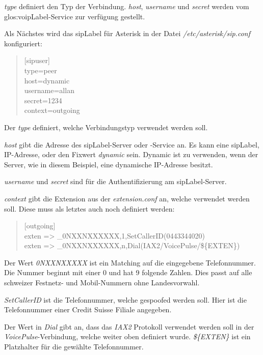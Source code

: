 \textit{type} definiert den Typ der Verbindung. \textit{host}, \textit{username} und \textit{secret} werden vom \gls{glos:voipLabel}-Service zur verfügung gestellt.

Als Nächstes wird das \Gls{sipLabel} für Asterisk in der Datei \textit{/etc/asterisk/sip.conf} konfiguriert:
\begin{quote}
[sipuser]\\
type=peer\\
host=dynamic\\
username=allan\\
secret=1234\\
context=outgoing\\
\end{quote}

Der \textit{type} definiert, welche Verbindungstyp verwendet werden soll.

\textit{host} gibt die Adresse des \Gls{sipLabel}-Server oder -Service an. Es kann eine \Gls{sipLabel}, IP-Adresse, oder den Fixwert \textit{dynamic} sein. Dynamic ist zu verwenden, wenn der Server, wie in diesem Beispiel, eine dynamische IP-Adresse besitzt.

\textit{username} und \textit{secret} sind für die Authentifizierung am \Gls{sipLabel}-Server.

\textit{context} gibt die Extension aus der \textit{extension.conf} an, welche verwendet werden soll. Diese muss als letztes auch noch definiert werden:

\begin{quote}
[outgoing]\\
exten => \_0NXXNXXXXXX,1,SetCallerID(0443344020)\\
exten => \_0NXXNXXXXXX,n,Dial(IAX2/VoicePulse/\$\{EXTEN\})\\
\end{quote}

Der Wert \textit{0NXXNXXXXX} ist ein Matching auf die eingegebene Telefonnummer. Die Nummer beginnt mit einer 0 und hat 9 folgende Zahlen. Dies passt auf alle schweizer Festnetz- und Mobil-Nummern ohne Landesvorwahl. 

\textit{SetCallerID} ist die Telefonnummer, welche gespoofed werden soll. Hier ist die Telefonnummer einer Credit Suisse Filiale angegeben.

Der Wert in \textit{Dial} gibt an, dass das \textit{IAX2} Protokoll verwendet werden soll in der \textit{VoicePulse}-Verbindung, welche weiter oben definiert wurde. \textit{\$\{EXTEN\}} ist ein Platzhalter für die gewählte Telefonnummer.

